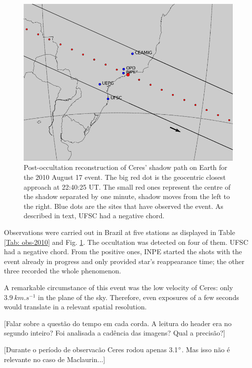 \documentclass[useAMS,usenatbib]{mn2e}
\begin{document}
\begin{figure}
\includegraphics[scale=0.42]{figures/Ceres_2010.png} 
\caption{Post-occultation reconstruction of Ceres' shadow path on Earth for the 2010 August 17 event. The big red dot is the geocentric closest approach at 22:40:25 UT. The small red ones represent the centre of the shadow separated by one minute, shadow moves from the left to the right. Blue dots are the sites that have observed the event. As described in text, UFSC had a negative chord.
\label{Fig: Ceres-2010-map}}
\end{figure}

Observations were carried out in Brazil at five stations as displayed in Table \ref{Tab: obs-2010} and Fig. \ref{Fig: Ceres-2010-map}. The occultation was detected on four of them. UFSC had a negative chord. From the positive ones, INPE started the shots with the event already in progress and only provided star's reappearance time; the other three recorded the whole phenomenon.

A remarkable circumstance of this event was the low velocity of Ceres: only $3.9~km.s^{-1}$ in the plane of the sky. Therefore, even exposures of a few seconds would translate in a relevant spatial resolution.


[Falar sobre a quest\~ao do tempo em cada corda. A leitura do header era no segundo inteiro? Foi analisada a cad\^encia das imagens? Qual a precis\~ao?]

[Durante o per\'iodo de observac\~ao Ceres rodou apenas 3.1$\hbox{$^\circ$}$. Mas isso n\~ao \'e relevante no caso de Maclaurin...]
\end{document}
